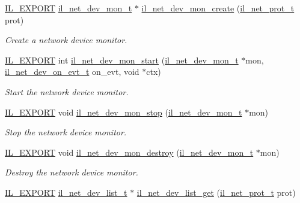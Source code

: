 \begin{DoxyCompactItemize}
\hyperlink{common_8h_a6bb629d26c52bfe10519ba3176853f47}{I\+L\+\_\+\+E\+X\+P\+O\+RT} \hyperlink{group__IL__NET_ga732e586d3465268782c0c227056736e5}{il\+\_\+net\+\_\+dev\+\_\+mon\+\_\+t} $\ast$ \hyperlink{group__IL__NET_ga78022aea4dc9147a87544533f2999bd9}{il\+\_\+net\+\_\+dev\+\_\+mon\+\_\+create} (\hyperlink{group__IL__NET_ga9629f7451843e493e7665754b5c2feca}{il\+\_\+net\+\_\+prot\+\_\+t} prot)
\begin{DoxyCompactList}\small\item\em Create a network device monitor. \end{DoxyCompactList}\item 
\hyperlink{common_8h_a6bb629d26c52bfe10519ba3176853f47}{I\+L\+\_\+\+E\+X\+P\+O\+RT} int \hyperlink{group__IL__NET_gac0ed4c0656f51a2e691907ccd8ac94ce}{il\+\_\+net\+\_\+dev\+\_\+mon\+\_\+start} (\hyperlink{group__IL__NET_ga732e586d3465268782c0c227056736e5}{il\+\_\+net\+\_\+dev\+\_\+mon\+\_\+t} $\ast$mon, \hyperlink{group__IL__NET_ga86bfa409239ad771481bd4dd1a451367}{il\+\_\+net\+\_\+dev\+\_\+on\+\_\+evt\+\_\+t} on\+\_\+evt, void $\ast$ctx)
\begin{DoxyCompactList}\small\item\em Start the network device monitor. \end{DoxyCompactList}\item 
\hyperlink{common_8h_a6bb629d26c52bfe10519ba3176853f47}{I\+L\+\_\+\+E\+X\+P\+O\+RT} void \hyperlink{group__IL__NET_ga88fb38bdcb516562c504588b37ab934a}{il\+\_\+net\+\_\+dev\+\_\+mon\+\_\+stop} (\hyperlink{group__IL__NET_ga732e586d3465268782c0c227056736e5}{il\+\_\+net\+\_\+dev\+\_\+mon\+\_\+t} $\ast$mon)
\begin{DoxyCompactList}\small\item\em Stop the network device monitor. \end{DoxyCompactList}\item 
\hyperlink{common_8h_a6bb629d26c52bfe10519ba3176853f47}{I\+L\+\_\+\+E\+X\+P\+O\+RT} void \hyperlink{group__IL__NET_ga71f76ab3a41bde25b3b77a661ff767d8}{il\+\_\+net\+\_\+dev\+\_\+mon\+\_\+destroy} (\hyperlink{group__IL__NET_ga732e586d3465268782c0c227056736e5}{il\+\_\+net\+\_\+dev\+\_\+mon\+\_\+t} $\ast$mon)
\begin{DoxyCompactList}\small\item\em Destroy the network device monitor. \end{DoxyCompactList}\item 
\hyperlink{common_8h_a6bb629d26c52bfe10519ba3176853f47}{I\+L\+\_\+\+E\+X\+P\+O\+RT} \hyperlink{group__IL__NET_ga9c0173ee0e17218e9f6dcc5ae0a6f74d}{il\+\_\+net\+\_\+dev\+\_\+list\+\_\+t} $\ast$ \hyperlink{group__IL__NET_gaa59e20a4749f276763c45e5d278934d3}{il\+\_\+net\+\_\+dev\+\_\+list\+\_\+get} (\hyperlink{group__IL__NET_ga9629f7451843e493e7665754b5c2feca}{il\+\_\+net\+\_\+prot\+\_\+t} prot)

\end{DoxyCompactItemize}
